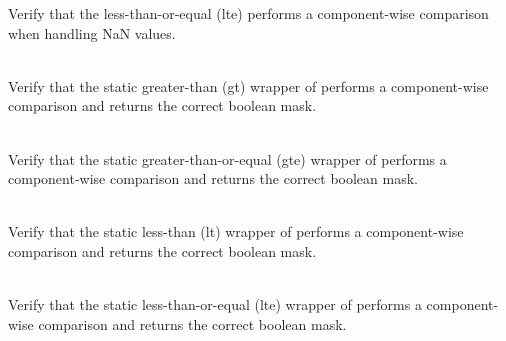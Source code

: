\begin{DoxyRefList}
\label{test__test000065}%
%
Verify that the  less-\/than-\/or-\/equal (lte) performs a component-\/wise comparison when handling NaN values.  
\item[{\parbox[t]{\linewidth}{Member \doxylink{group___f_g_m___vec4___g_t___comp_ga18b5d91f2fe8abfbbb304cfa88093993}{Vector4\+DComparison\+\_\+\+Static\+Wrapper\+\_\+\+Greater\+Than\+\_\+\+Returns\+Boolean\+Vector\+With\+Elements\+Greater\+Than\+As\+True} ()}}]\hfill \\
\label{test__test000045}%
%
Verify that the static greater-\/than (gt) wrapper of  performs a component-\/wise comparison and returns the correct boolean mask.  
\item[{\parbox[t]{\linewidth}{Member \doxylink{group___f_g_m___vec4___g_t_e___comp_ga78d194ab866842ab19e791107a9a5a18}{Vector4\+DComparison\+\_\+\+Static\+Wrapper\+\_\+\+Greater\+Than\+Or\+Equal\+\_\+\+Returns\+Boolean\+Vector\+With\+Elements\+Greater\+Than\+Or\+Equal\+As\+True} ()}}]\hfill \\
\label{test__test000051}%
%
Verify that the static greater-\/than-\/or-\/equal (gte) wrapper of  performs a component-\/wise comparison and returns the correct boolean mask.  
\item[{\parbox[t]{\linewidth}{Member \doxylink{group___f_g_m___vec4___l_t___comp_ga017497da1813cb7fb766513c6cd8d8bb}{Vector4\+DComparison\+\_\+\+Static\+Wrapper\+\_\+\+Less\+Than\+\_\+\+Returns\+Boolean\+Vector\+With\+Elements\+Less\+Than\+As\+True} ()}}]\hfill \\
\label{test__test000057}%
%
Verify that the static less-\/than (lt) wrapper of  performs a component-\/wise comparison and returns the correct boolean mask.  
\item[{\parbox[t]{\linewidth}{Member \doxylink{group___f_g_m___vec4___l_t_e___comp_ga6ea51120faedc739f27775469ecc1204}{Vector4\+DComparison\+\_\+\+Static\+Wrapper\+\_\+\+Less\+Than\+Or\+Equal\+\_\+\+Returns\+Boolean\+Vector\+With\+Elements\+Less\+Than\+Or\+Equal\+As\+True} ()}}]\hfill \\
\label{test__test000063}%
%
Verify that the static less-\/than-\/or-\/equal (lte) wrapper of  performs a component-\/wise comparison and returns the correct boolean mask.  

\end{DoxyRefList}
